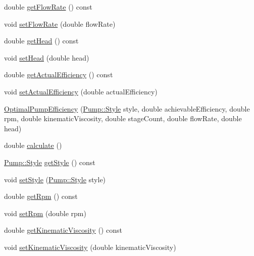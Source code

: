 \begin{DoxyCompactItemize}
\item 
double \hyperlink{class_optimal_pump_efficiency_a77c6618681b0fd3a0fc02dc49d16ee99}{get\+Flow\+Rate} () const
\item 
void \hyperlink{class_optimal_pump_efficiency_a90067b57c559fd3274fb8d6e00f6221d}{set\+Flow\+Rate} (double flow\+Rate)
\item 
double \hyperlink{class_optimal_pump_efficiency_af31fdb10aabc197ff7536c9bbe006573}{get\+Head} () const
\item 
void \hyperlink{class_optimal_pump_efficiency_ac317c900ec68797cf051977147ea33da}{set\+Head} (double head)
\item 
double \hyperlink{class_optimal_pump_efficiency_aa2ac8a7c61bc28f82e30cb44b9c21008}{get\+Actual\+Efficiency} () const
\item 
void \hyperlink{class_optimal_pump_efficiency_a539b20c53c7ba6a5983a60d74be4ac9e}{set\+Actual\+Efficiency} (double actual\+Efficiency)
\item 
\hyperlink{class_optimal_pump_efficiency_ae07626ea079ff810ac6518d54c52b24a}{Optimal\+Pump\+Efficiency} (\hyperlink{class_pump_aef354601ce4218258cc898b35a1e90ff}{Pump\+::\+Style} style, double achievable\+Efficiency, double rpm, double kinematic\+Viscosity, double stage\+Count, double flow\+Rate, double head)
\item 
double \hyperlink{class_optimal_pump_efficiency_ac40720d1fcdf40d8b364df37e58e7f4d}{calculate} ()
\item 
\hyperlink{class_pump_aef354601ce4218258cc898b35a1e90ff}{Pump\+::\+Style} \hyperlink{class_optimal_pump_efficiency_a601fe15e9acc23112743fabe417030fb}{get\+Style} () const
\item 
void \hyperlink{class_optimal_pump_efficiency_ab6b85c8c08d6641c5375c65436f16a2f}{set\+Style} (\hyperlink{class_pump_aef354601ce4218258cc898b35a1e90ff}{Pump\+::\+Style} style)
\item 
double \hyperlink{class_optimal_pump_efficiency_a58e8a430ced612e0518abd07fb30b085}{get\+Rpm} () const
\item 
void \hyperlink{class_optimal_pump_efficiency_afc6b6f46b4e289efc8819249ad1c9fb5}{set\+Rpm} (double rpm)
\item 
double \hyperlink{class_optimal_pump_efficiency_a8c2f7fcacce2b42ed83f29aec2d4671e}{get\+Kinematic\+Viscosity} () const
\item 
void \hyperlink{class_optimal_pump_efficiency_a00017e0bd100beb2f4b0bf2db5e3687f}{set\+Kinematic\+Viscosity} (double kinematic\+Viscosity)
\item 

\end{DoxyCompactItemize}
